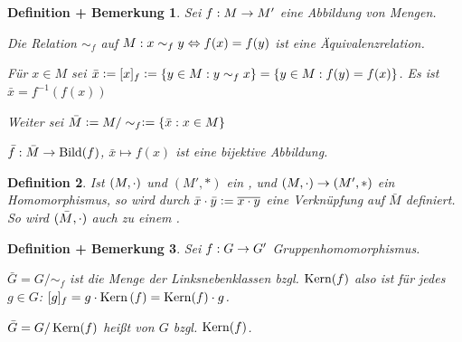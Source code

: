 \documentclass[a4paper,10pt,german]{scrbook}
\theoremstyle{saetze}
\theoremstyle{definitionen}
\newtheorem{Def}{Definition}[section]
\newtheorem{DefBem}[Def]{Definition + Bemerkung}
\begin{document}
\begin{DefBem}
    \label{restklassendefinition}
    Sei $f: M \rightarrow M'$ eine Abbildung von Mengen.
    
    \begin{enum}
        \item Die Relation $\sim_f$ auf $M: x \sim_f y \Leftrightarrow f(x) = f(y)$ ist
        eine Äquivalenzrelation.

        \item Für $x \in M$ sei $\bar x \mathrel{\mathop:}= [x]_f \mathrel{\mathop:}= \{ y \in M : y\sim_f x\} = \{ y\in M: f(y)= f(x)\}$.
	Es ist $\bar x = f^{-1}(f(x))$
	
	Weiter sei $\bar M \mathrel{\mathop:}= M/\sim_f \mathrel{\mathop:}= \{ \bar x : x \in M\}$

	\item $\bar f : \bar M\to \mathop{\rm Bild}\nolimits(f)$, $\bar x\mapsto f(x)$ ist eine bijektive Abbildung.

    \end{enum}
\end{DefBem}

\begin{Def}
        Ist $(M,\cdot)$ und $(M',\ast)$ ein \bla, und $(M,\cdot) \rightarrow (M', \ast)$ ein Homomorphismus, so wird durch
        $\bar x \cdot \bar y \mathrel{\mathop:}= \overline{x \cdot y}$ eine Verknüpfung auf $\bar M$ 
        definiert. So wird $(\bar M,\cdot)$ auch zu einem \bla.
\end{Def}

\begin{DefBem}
\label{1.14}
    \label{gruppenfaktorgruppe}
    Sei $f:G \rightarrow G'$ Gruppenhomomorphismus.
    
    \begin{enum}
        \item $\bar G = G/\sim_f$ ist
        die Menge der Linksnebenklassen bzgl. $\mathop{\rm Kern}\nolimits(f)$ also ist für jedes $g\in G$: $[g]_f = g\cdot \mathop{\rm Kern}\nolimits{}(f) = \mathop{\rm Kern}\nolimits(f)\cdot g$.

        \item  $\bar G = G/\mathop{\rm Kern}\nolimits(f)$ heißt  von $G$ bzgl.
        $\mathop{\rm Kern}\nolimits(f)$. 
    \end{enum}
\end{DefBem}
\end{document}
